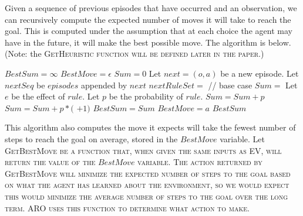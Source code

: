 \documentclass[letterpaper]{article} %
\begin{document}
Given a sequence of previous episodes that have occurred and an
observation, we can recursively compute the expected number of moves
it will take to reach the goal. This is computed under the assumption
that at each choice the agent may have in the future, it will make the
best possible move. The algorithm is below.  (Note:
the \scshape GetHeuristic \normalfont function will be defined later in the paper.)


\algrenewcommand\algorithmicindent{1.25em}
\begin{algorithmic}[1]
		\State $BestSum = \infty$
		\State $BestMove = \epsilon$
			\State $Sum = 0$
			\State Let $next = (o, a)$ be a new episode.
			\State Let $nextSeq$ be $episodes$ appended by $next$
			\State $nextRuleSet =$ 
			 \hspace{35pt} // base case
				\State $Sum = $  \label{line:heuristic}
			\EndIf
				\State Let $e$ be the effect of $rule$.
				\State Let $p$ be the probability of $rule$.
					\State $Sum = Sum + p$
				\Else
					\State $Sum = Sum + p*($ $ + 1)$
				\EndIf
			\EndFor
				\State $BestSum = Sum$
				\State $BestMove = a$
			\EndIf
		\EndFor
	\State \Return $BestSum$
	\EndFunction
\end{algorithmic}

This algorithm also computes the move it expects will take the fewest number of steps to reach the goal on average, stored in the $BestMove$ variable. Let \scshape GetBestMove \normalfont be a function that, when given the same inputs as \scshape EV\normalfont, will return the value of the $BestMove$ variable. The action returned by \scshape GetBestMove \normalfont will minimize the expected number of steps to the goal based on what the agent has learned about the environment, so we would expect this would minimize the average number of steps to the goal  over the long term. ARO uses this function to determine what action to make.
\end{document}
